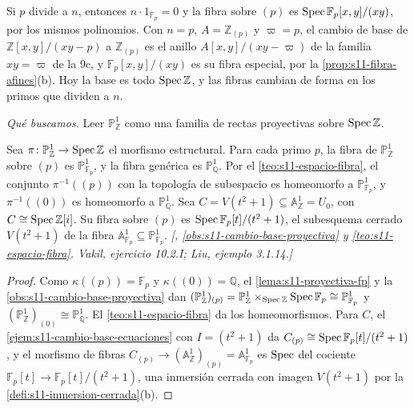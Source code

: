 \begin{obs}
\label{obs:s11-primos-dividen-n}
Si \(p\) divide a \(n\), entonces \(n\cdot1_{\mathbb F_p}=0\) y la fibra sobre \((p)\) es \(\operatorname{Spec}\mathbb F_p[x,y]/(xy)\), por los mismos polinomios. Con \(n=p\), \(A=\mathbb Z_{(p)}\) y \(\varpi=p\), el cambio de base de \(\mathbb Z[x,y]/(xy-p)\) a \(\mathbb Z_{(p)}\) es el anillo \(A[x,y]/(xy-\varpi)\) de la familia \(xy=\varpi\) de la 9c, y \(\mathbb F_p[x,y]/(xy)\) es su fibra especial, por la \cref{prop:s11-fibra-afines}(b). Hoy la base es todo \(\operatorname{Spec}\mathbb Z\), y las fibras cambian de forma en los primos que dividen a \(n\).
\end{obs}

\emph{Qué buscamos.} Leer \(\mathbb P^1_{\mathbb Z}\) como una familia de rectas proyectivas sobre \(\operatorname{Spec}\mathbb Z\).

\begin{ejem}
\label{ejem:s11-fibras-proyectiva-z}
Sea \(\pi\colon\mathbb P^1_{\mathbb Z}\to\operatorname{Spec}\mathbb Z\) el morfismo estructural. Para cada primo \(p\), la fibra de \(\mathbb P^1_{\mathbb Z}\) sobre \((p)\) es \(\mathbb P^1_{\mathbb F_p}\), y la fibra genérica es \(\mathbb P^1_{\mathbb Q}\). Por el \cref{teo:s11-espacio-fibra}, el conjunto \(\pi^{-1}((p))\) con la topología de subespacio es homeomorfo a \(\mathbb P^1_{\mathbb F_p}\), y \(\pi^{-1}((0))\) es homeomorfo a \(\mathbb P^1_{\mathbb Q}\). Sea \(C=V(t^2+1)\subseteq\mathbb A^1_{\mathbb Z}=U_0\), con \(C\cong\operatorname{Spec}\mathbb Z[i]\). Su fibra sobre \((p)\) es \(\operatorname{Spec}\mathbb F_p[t]/(t^2+1)\), el subesquema cerrado \(V(t^2+1)\) de la fibra \(\mathbb A^1_{\mathbb F_p}\subseteq\mathbb P^1_{\mathbb F_p}\). \emph{[, \cref{obs:s11-cambio-base-proyectiva} y \cref{teo:s11-espacio-fibra}. Vakil, ejercicio 10.2.I; Liu, ejemplo 3.1.14.]}
\end{ejem}

\begin{proof}
Como \(\kappa((p))=\mathbb F_p\) y \(\kappa((0))=\mathbb Q\), el \cref{lema:s11-proyectiva-fp} y la \cref{obs:s11-cambio-base-proyectiva} dan \((\mathbb P^1_{\mathbb Z})_{(p)}=\mathbb P^1_{\mathbb Z}\times_{\operatorname{Spec}\mathbb Z}\operatorname{Spec}\mathbb F_p\cong\mathbb P^1_{\mathbb F_p}\) y \((\mathbb P^1_{\mathbb Z})_{(0)}\cong\mathbb P^1_{\mathbb Q}\). El \cref{teo:s11-espacio-fibra} da los homeomorfismos. Para \(C\), el \cref{ejem:s11-cambio-base-ecuaciones} con \(I=(t^2+1)\) da \(C_{(p)}\cong\operatorname{Spec}\mathbb F_p[t]/(t^2+1)\), y el morfismo de fibras \(C_{(p)}\to(\mathbb A^1_{\mathbb Z})_{(p)}=\mathbb A^1_{\mathbb F_p}\) es \(\operatorname{Spec}\) del cociente \(\mathbb F_p[t]\to\mathbb F_p[t]/(t^2+1)\), una inmersión cerrada con imagen \(V(t^2+1)\) por la \cref{defi:s11-inmersion-cerrada}(b).
\end{proof}


